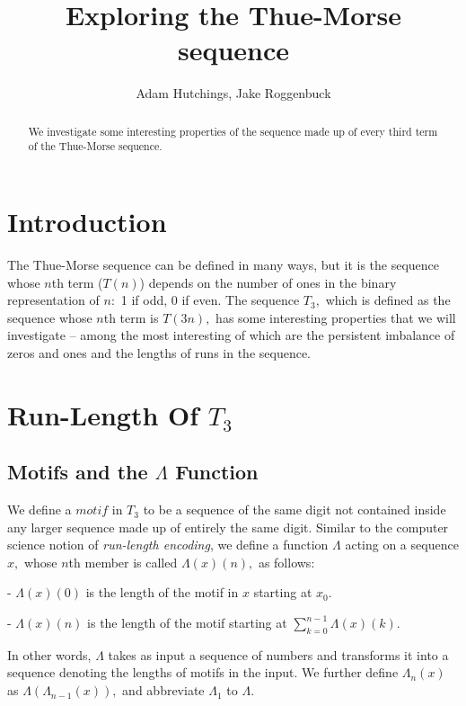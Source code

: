 \documentclass{article}
\begin{document}
\title{Exploring the Thue-Morse sequence}
\author{Adam Hutchings, Jake Roggenbuck}
\maketitle

\begin{abstract}
We investigate some interesting properties of the sequence made up of every third term of the Thue-Morse sequence.
\end{abstract}

\tableofcontents

\section{Introduction}
The Thue-Morse sequence can be defined in many ways, but it is the sequence whose $n$th term ($T(n)$) depends on the number of ones in the binary representation of $n:$ 1 if odd, 0 if even. The sequence $T_3,$ which is defined as the sequence whose $n$th term is $T(3n),$ has some interesting properties that we will investigate -- among the most interesting of which are the persistent imbalance of zeros and ones and the lengths of runs in the sequence.

\section{Run-Length Of $T_3$}

\subsection{Motifs and the $\Lambda$ Function}
We define a $motif$ in $T_3$ to be a sequence of the same digit not contained inside any larger sequence made up of entirely the same digit. Similar to the computer science notion of \emph{run-length encoding}, we define a function $\Lambda$ acting on a sequence $x,$ whose $n$th member is called $\Lambda(x)(n),$ as follows:

- $\Lambda(x)(0)$ is the length of the motif in $x$ starting at $x_0$.

- $\Lambda(x)(n)$ is the length of the motif starting at $\sum_{k=0}^{n-1} \Lambda(x)(k).$

In other words, $\Lambda$ takes as input a sequence of numbers and transforms it into a sequence denoting the lengths of motifs in the input. We further define $\Lambda_n(x)$ as $\Lambda(\Lambda_{n-1}(x)),$ and abbreviate $\Lambda_1$ to $\Lambda$.
\end{document}
